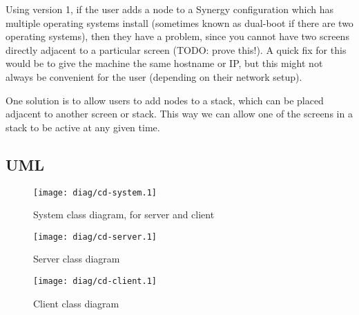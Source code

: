 Using version 1, if the user adds a node to a Synergy configuration which has
multiple operating systems install (sometimes known as dual-boot if there are
two operating systems), then they have a problem, since you cannot have two
screens directly adjacent to a particular screen (TODO: prove this!). A quick
fix for this would be to give the machine the same hostname or IP, but this
might not always be convenient for the user (depending on their network setup).

One solution is to allow users to add nodes to a stack, which can be placed
adjacent to another screen or stack. This way we can allow one of the screens
in a stack to be active at any given time.

\clearpage
\subsection{UML}

\begin{figure}[ht!]
  \begin{center}
    \texttt{[image: diag/cd-system.1]}
    \caption{System class diagram, for server and client}
    \label{fig:systemClassDiagram}
  \end{center}
\end{figure}

\begin{figure}[ht!]
  \begin{center}
    \texttt{[image: diag/cd-server.1]}
    \caption{Server class diagram}
    \label{fig:serverClassDiagram}
  \end{center}
\end{figure}

\begin{figure}[ht!]
  \begin{center}
    \texttt{[image: diag/cd-client.1]}
    \caption{Client class diagram}
    \label{fig:clientClassDiagram}
  \end{center}
\end{figure}

